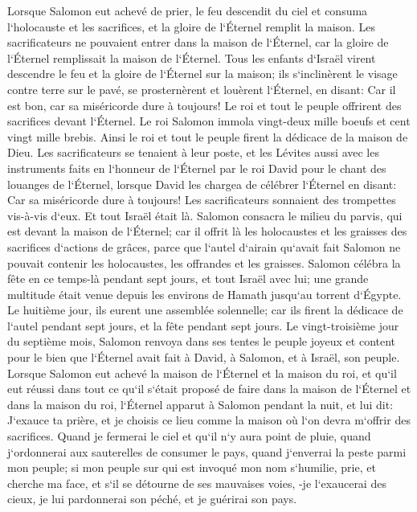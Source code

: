 \verse Lorsque Salomon eut achevé de prier, le feu descendit du ciel et consuma l`holocauste et les sacrifices, et la gloire de l`Éternel remplit la maison. 
\verse Les sacrificateurs ne pouvaient entrer dans la maison de l`Éternel, car la gloire de l`Éternel remplissait la maison de l`Éternel. 
\verse Tous les enfants d`Israël virent descendre le feu et la gloire de l`Éternel sur la maison; ils s`inclinèrent le visage contre terre sur le pavé, se prosternèrent et louèrent l`Éternel, en disant: Car il est bon, car sa miséricorde dure à toujours! 
\verse Le roi et tout le peuple offrirent des sacrifices devant l`Éternel. 
\verse Le roi Salomon immola vingt-deux mille boeufs et cent vingt mille brebis. Ainsi le roi et tout le peuple firent la dédicace de la maison de Dieu. 
\verse Les sacrificateurs se tenaient à leur poste, et les Lévites aussi avec les instruments faits en l`honneur de l`Éternel par le roi David pour le chant des louanges de l`Éternel, lorsque David les chargea de célébrer l`Éternel en disant: Car sa miséricorde dure à toujours! Les sacrificateurs sonnaient des trompettes vis-à-vis d`eux. Et tout Israël était là. 
\verse Salomon consacra le milieu du parvis, qui est devant la maison de l`Éternel; car il offrit là les holocaustes et les graisses des sacrifices d`actions de grâces, parce que l`autel d`airain qu`avait fait Salomon ne pouvait contenir les holocaustes, les offrandes et les graisses. 
\verse Salomon célébra la fête en ce temps-là pendant sept jours, et tout Israël avec lui; une grande multitude était venue depuis les environs de Hamath jusqu`au torrent d`Égypte. 
\verse Le huitième jour, ils eurent une assemblée solennelle; car ils firent la dédicace de l`autel pendant sept jours, et la fête pendant sept jours. 
\verse Le vingt-troisième jour du septième mois, Salomon renvoya dans ses tentes le peuple joyeux et content pour le bien que l`Éternel avait fait à David, à Salomon, et à Israël, son peuple. 
\verse Lorsque Salomon eut achevé la maison de l`Éternel et la maison du roi, et qu`il eut réussi dans tout ce qu`il s`était proposé de faire dans la maison de l`Éternel et dans la maison du roi, 
\verse l`Éternel apparut à Salomon pendant la nuit, et lui dit: J`exauce ta prière, et je choisis ce lieu comme la maison où l`on devra m`offrir des sacrifices. 
\verse Quand je fermerai le ciel et qu`il n`y aura point de pluie, quand j`ordonnerai aux sauterelles de consumer le pays, quand j`enverrai la peste parmi mon peuple; 
\verse si mon peuple sur qui est invoqué mon nom s`humilie, prie, et cherche ma face, et s`il se détourne de ses mauvaises voies, -je l`exaucerai des cieux, je lui pardonnerai son péché, et je guérirai son pays. 
